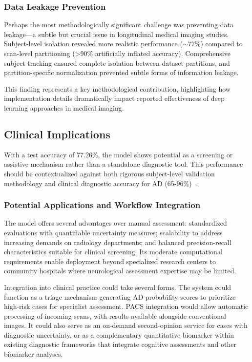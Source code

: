 \documentclass[11pt, a4paper]{article}
\begin{document}
\subsubsection{Data Leakage Prevention}

Perhaps the most methodologically significant challenge was preventing data leakage—a subtle but crucial issue in longitudinal medical imaging studies. Subject-level isolation revealed more realistic performance ($\sim$77\%) compared to scan-level partitioning (>90\% artificially inflated accuracy). Comprehensive subject tracking ensured complete isolation between dataset partitions, and partition-specific normalization prevented subtle forms of information leakage.

This finding represents a key methodological contribution, highlighting how implementation details dramatically impact reported effectiveness of deep learning approaches in medical imaging.

\subsection{Clinical Implications}

With a test accuracy of 77.26\%, the model shows potential as a screening or assistive mechanism rather than a standalone diagnostic tool. This performance should be contextualized against both rigorous subject-level validation methodology and clinical diagnostic accuracy for AD (65-96\%)~\cite{kloppel2008accuracy}.

\subsubsection{Potential Applications and Workflow Integration}

The model offers several advantages over manual assessment: standardized evaluations with quantifiable uncertainty measures; scalability to address increasing demands on radiology departments; and balanced precision-recall characteristics suitable for clinical screening. Its moderate computational requirements enable deployment beyond specialized research centers to community hospitals where neurological assessment expertise may be limited.

Integration into clinical practice could take several forms. The system could function as a triage mechanism generating AD probability scores to prioritize high-risk cases for specialist assessment. PACS integration would allow automatic processing of incoming scans, with results available alongside conventional images. It could also serve as an on-demand second-opinion service for cases with diagnostic uncertainty, or as a complementary quantitative biomarker within existing diagnostic frameworks that integrate cognitive assessments and other biomarker analyses.
\end{document}

